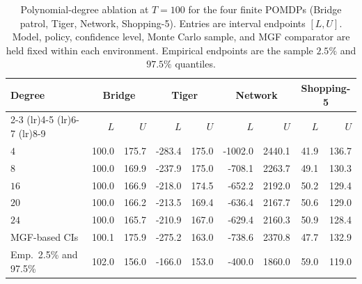 \begin{table}[t]
\centering
\caption{Polynomial-degree ablation at $T=100$ for the four finite POMDPs (Bridge patrol, Tiger, Network, Shopping-5). Entries are interval endpoints $[L,U]$. Model, policy, confidence level, Monte Carlo sample, and MGF comparator are held fixed within each environment. Empirical endpoints are the sample $2.5\%$ and $97.5\%$ quantiles.}
\label{tab:poly_degree_ablation_fs}
\small
\setlength{\tabcolsep}{3.8pt}
\begin{tabular}{lrrrrrrrr}
\toprule
Degree & \multicolumn{2}{c}{Bridge} & \multicolumn{2}{c}{Tiger} & \multicolumn{2}{c}{Network} & \multicolumn{2}{c}{Shopping-5} \\
\cmidrule(lr){2-3} \cmidrule(lr){4-5} \cmidrule(lr){6-7} \cmidrule(lr){8-9}
 & $L$ & $U$ & $L$ & $U$ & $L$ & $U$ & $L$ & $U$ \\
\midrule
$4$ & 100.0 & 175.7 & -283.4 & 175.0 & -1002.0 & 2440.1 & 41.9 & 136.7 \\
$8$ & 100.0 & 169.9 & -237.9 & 175.0 & -708.1 & 2263.7 & 49.1 & 130.3 \\
$16$ & 100.0 & 166.9 & -218.0 & 174.5 & -652.2 & 2192.0 & 50.2 & 129.4 \\
$20$ & 100.0 & 166.2 & -213.5 & 169.4 & -636.4 & 2167.7 & 50.6 & 129.0 \\
$24$ & 100.0 & 165.7 & -210.9 & 167.0 & -629.4 & 2160.3 & 50.9 & 128.4 \\
\midrule
MGF-based CIs & 100.1 & 175.9 & -275.2 & 163.0 & -738.6 & 2370.8 & 47.7 & 132.9 \\
Emp.\ 2.5\% and 97.5\% & 102.0 & 156.0 & -166.0 & 153.0 & -400.0 & 1860.0 & 59.0 & 119.0 \\
\bottomrule
\end{tabular}
\end{table}
